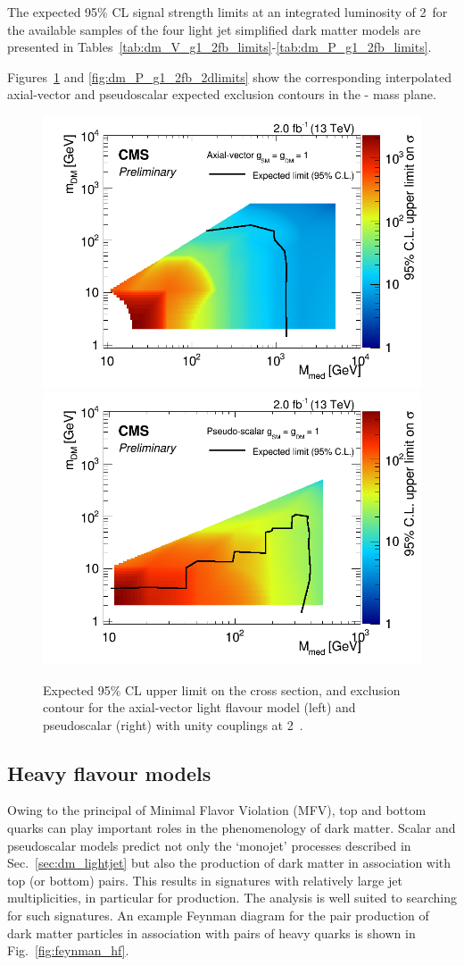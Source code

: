 The expected 95\% CL signal strength limits at an integrated luminosity of 2~\ifb for
the available samples of the four light jet simplified dark matter models are
presented in
Tables~\ref{tab:dm_V_g1_2fb_limits}-\ref{tab:dm_P_g1_2fb_limits}.

Figures~\ref{fig:dm_A_g1_2fb_2dlimits} and \ref{fig:dm_P_g1_2fb_2dlimits} show
the corresponding interpolated axial-vector and pseudoscalar expected exclusion 
contours in the {\mphi-\mchi} mass plane.



%
 

%



\begin{figure}
\begin{center}
\includegraphics[width=0.\textwidth]{figures/DMplots/dm_A_g1p0_2p0fb_2dlimits.png} \\
\includegraphics[width=0.\textwidth]{figures/DMplots/dm_P_g1p0_2p0fb_2dlimits.png} \\
\caption{Expected 95\% CL upper limit on the cross section, and exclusion
contour for the axial-vector light flavour model (left) and pseudoscalar (right) with unity couplings at 2~\ifb.}
\label{fig:dm_A_g1_2fb_2dlimits}
\end{center}
\end{figure}


\clearpage 
\subsection{Heavy flavour models} \label{sec:dm_heavyjet}

Owing to the principal of Minimal Flavor Violation (MFV), top and bottom quarks
can play important roles in the phenomenology of dark matter. Scalar and
pseudoscalar models predict not only the `monojet' processes described in
Sec.~\ref{sec:dm_lightjet} but also the production of dark matter in association
with top (or bottom) pairs. This results in signatures with relatively large jet
multiplicities, in particular for \DMtt production. The \alphat analysis is well 
suited to searching for such signatures. An example Feynman diagram for the pair
production of dark matter particles in association with pairs of heavy quarks is
shown in Fig.~\ref{fig:feynman_hf}.


